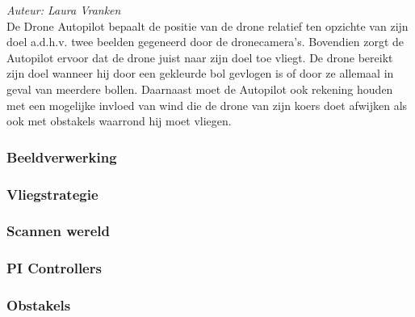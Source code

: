 {\em Auteur: Laura Vranken}\\

\noindent
De Drone Autopilot bepaalt de positie van de drone relatief ten opzichte van zijn doel a.d.h.v. twee beelden gegeneerd door de dronecamera's. Bovendien zorgt de Autopilot ervoor dat de drone juist naar zijn doel toe vliegt. De drone bereikt zijn doel wanneer hij door een gekleurde bol gevlogen is of door ze allemaal in geval van meerdere bollen.  Daarnaast moet de Autopilot ook rekening houden met een mogelijke invloed van wind die de drone van zijn koers doet afwijken als ook met obstakels waarrond hij moet vliegen.

\subsubsection{Beeldverwerking}
\label{subsec: Beeldverwerking}


\subsubsection{Vliegstrategie}
\label{subsec: Vliegstrategie}


\subsubsection{Scannen wereld}
\label{subsec: Scannen wereld}


\subsubsection{PI Controllers}
\label{subsec: PI Controllers}


\subsubsection{Obstakels}
\label{subsec: Obstakels}



















